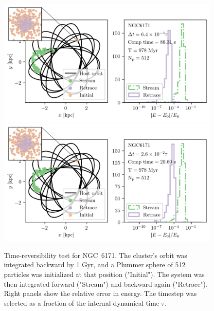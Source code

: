        \begin{figure}
            \centering
            \includegraphics[width=\linewidth]{images/NumericalErrorStreamRetrace_NGC6171_Nsteps_524288_stepsPerTau_155.png}
            \includegraphics[width=\linewidth]{images/NumericalErrorStreamRetrace_NGC6171_Nsteps_131072_stepsPerTau_38.png}
            \caption{Time-reversibility test for NGC~6171. The cluster's orbit was integrated backward by 1 Gyr, and a Plummer sphere of 512 particles was initialized at that position ("Initial"). The system was then integrated forward ("Stream") and backward again ("Retrace"). Right panels show the relative error in energy. The timestep was selected as a fraction of the internal dynamical time $\tau$.}
            \label{fig:NumericalErrorStreamRetrace_NGC6171_Nsteps_524288_stepsPerTau_155}
        \end{figure}


